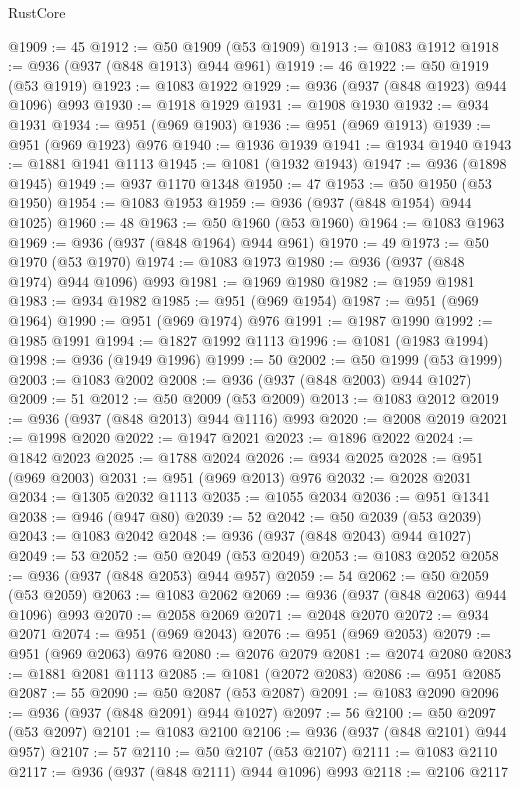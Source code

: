 \begin{lexlean}{RustCore}
\begin{coremodule}
@1909 := 45
@1912 := @50 @1909 (@53 @1909)
@1913 := @1083 @1912
@1918 := @936 (@937 (@848 @1913) @944 @961)
@1919 := 46
@1922 := @50 @1919 (@53 @1919)
@1923 := @1083 @1922
@1929 := @936 (@937 (@848 @1923) @944 @1096) @993
@1930 := @1918 @1929
@1931 := @1908 @1930
@1932 := @934 @1931
@1934 := @951 (@969 @1903)
@1936 := @951 (@969 @1913)
@1939 := @951 (@969 @1923) @976
@1940 := @1936 @1939
@1941 := @1934 @1940
@1943 := @1881 @1941 @1113
@1945 := @1081 (@1932 @1943)
@1947 := @936 (@1898 @1945)
@1949 := @937 @1170 @1348
@1950 := 47
@1953 := @50 @1950 (@53 @1950)
@1954 := @1083 @1953
@1959 := @936 (@937 (@848 @1954) @944 @1025)
@1960 := 48
@1963 := @50 @1960 (@53 @1960)
@1964 := @1083 @1963
@1969 := @936 (@937 (@848 @1964) @944 @961)
@1970 := 49
@1973 := @50 @1970 (@53 @1970)
@1974 := @1083 @1973
@1980 := @936 (@937 (@848 @1974) @944 @1096) @993
@1981 := @1969 @1980
@1982 := @1959 @1981
@1983 := @934 @1982
@1985 := @951 (@969 @1954)
@1987 := @951 (@969 @1964)
@1990 := @951 (@969 @1974) @976
@1991 := @1987 @1990
@1992 := @1985 @1991
@1994 := @1827 @1992 @1113
@1996 := @1081 (@1983 @1994)
@1998 := @936 (@1949 @1996)
@1999 := 50
@2002 := @50 @1999 (@53 @1999)
@2003 := @1083 @2002
@2008 := @936 (@937 (@848 @2003) @944 @1027)
@2009 := 51
@2012 := @50 @2009 (@53 @2009)
@2013 := @1083 @2012
@2019 := @936 (@937 (@848 @2013) @944 @1116) @993
@2020 := @2008 @2019
@2021 := @1998 @2020
@2022 := @1947 @2021
@2023 := @1896 @2022
@2024 := @1842 @2023
@2025 := @1788 @2024
@2026 := @934 @2025
@2028 := @951 (@969 @2003)
@2031 := @951 (@969 @2013) @976
@2032 := @2028 @2031
@2034 := @1305 @2032 @1113
@2035 := @1055 @2034
@2036 := @951 @1341
@2038 := @946 (@947 @80)
@2039 := 52
@2042 := @50 @2039 (@53 @2039)
@2043 := @1083 @2042
@2048 := @936 (@937 (@848 @2043) @944 @1027)
@2049 := 53
@2052 := @50 @2049 (@53 @2049)
@2053 := @1083 @2052
@2058 := @936 (@937 (@848 @2053) @944 @957)
@2059 := 54
@2062 := @50 @2059 (@53 @2059)
@2063 := @1083 @2062
@2069 := @936 (@937 (@848 @2063) @944 @1096) @993
@2070 := @2058 @2069
@2071 := @2048 @2070
@2072 := @934 @2071
@2074 := @951 (@969 @2043)
@2076 := @951 (@969 @2053)
@2079 := @951 (@969 @2063) @976
@2080 := @2076 @2079
@2081 := @2074 @2080
@2083 := @1881 @2081 @1113
@2085 := @1081 (@2072 @2083)
@2086 := @951 @2085
@2087 := 55
@2090 := @50 @2087 (@53 @2087)
@2091 := @1083 @2090
@2096 := @936 (@937 (@848 @2091) @944 @1027)
@2097 := 56
@2100 := @50 @2097 (@53 @2097)
@2101 := @1083 @2100
@2106 := @936 (@937 (@848 @2101) @944 @957)
@2107 := 57
@2110 := @50 @2107 (@53 @2107)
@2111 := @1083 @2110
@2117 := @936 (@937 (@848 @2111) @944 @1096) @993
@2118 := @2106 @2117

\end{coremodule}
\end{lexlean}
